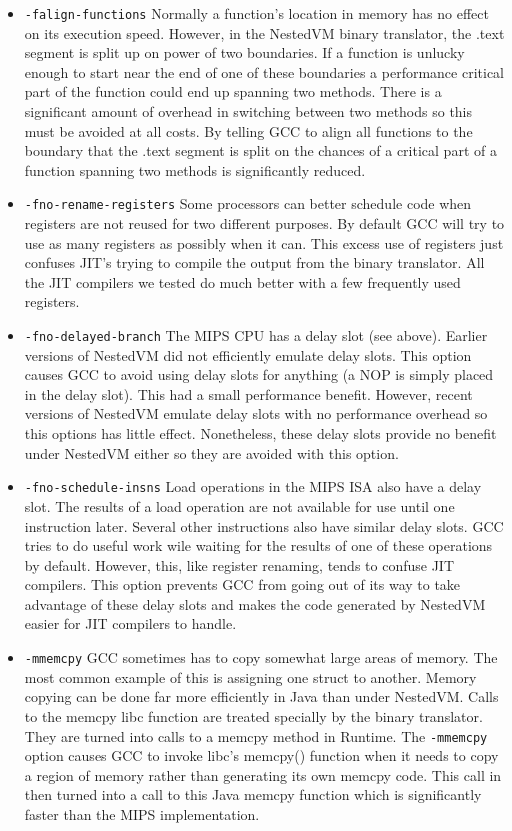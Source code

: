 \documentclass{acmconf}
\begin{document}
\begin{itemize}

\item {\tt -falign-functions}
Normally a function's location in memory has no effect on its execution
speed. However, in the NestedVM binary translator, the .text segment is
split up on power of two boundaries. If a function is unlucky enough to
start near the end of one of these boundaries a performance critical part of
the function could end up spanning two methods. There is a significant
amount of overhead in switching between two methods so this must be avoided
at all costs. By telling GCC to align all functions to the boundary that the
.text segment is split on the chances of a critical part of a function
spanning two methods is significantly reduced.

\item {\tt -fno-rename-registers}
Some processors can better schedule code when registers are not reused for
two different purposes. By default GCC will try to use as many registers as
possibly when it can. This excess use of registers just confuses JIT's
trying to compile the output from the binary translator. All the JIT
compilers we tested do much better with a few frequently used registers.

\item {\tt -fno-delayed-branch}
The MIPS CPU has a delay slot (see above). Earlier versions of NestedVM did
not efficiently emulate delay slots. This option causes GCC to avoid using
delay slots for anything (a NOP is simply placed in the delay slot). This
had a small performance benefit. However, recent versions of NestedVM
emulate delay slots with no performance overhead so this options has little
effect. Nonetheless, these delay slots provide no benefit under NestedVM
either so they are avoided with this option.

\item {\tt -fno-schedule-insns}
Load operations in the MIPS ISA also have a delay slot. The results of a
load operation are not available for use until one instruction later.
Several other instructions also have similar delay slots. GCC tries to do
useful work wile waiting for the results of one of these operations by
default. However, this, like register renaming, tends to confuse JIT
compilers. This option prevents GCC from going out of its way to take
advantage of these delay slots and makes the code generated by NestedVM
easier for JIT compilers to handle.

\item {\tt -mmemcpy}
GCC sometimes has to copy somewhat large areas of memory. The most common
example of this is assigning one struct to another. Memory copying can be
done far more efficiently in Java than under NestedVM. Calls to the memcpy
libc function are treated specially by the binary translator. They are
turned into calls to a memcpy method in Runtime. The {\tt -mmemcpy} option
causes GCC to invoke libc's memcpy() function when it needs to copy a region
of memory rather than generating its own memcpy code. This call in then
turned into a call to this Java memcpy function which is significantly
faster than the MIPS implementation.


\end{itemize}
\end{document}

